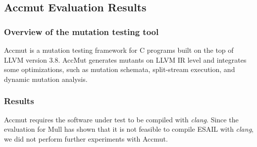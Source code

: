 \subsection{Accmut Evaluation Results}
\label{subsec:dextool}

\subsubsection{Overview of the mutation testing tool}

Accmut is a mutation testing framework for C programs built on the top of LLVM version 3.8. AccMut generates mutants on LLVM IR level and integrates some optimizations, such as mutation schemata, split-stream execution, and dynamic mutation analysis.

\subsubsection{Results}

Accmut requires the software under test to be compiled with \emph{clang}.
Since the evaluation for Mull has shown that it is not feasible to compile ESAIL with \emph{clang}, we did not perform further experiments with Accmut.


